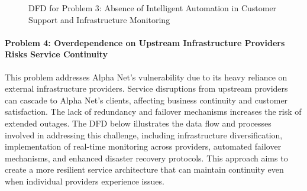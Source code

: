 \begin{figure}[H]
{%
    }
    \caption{DFD for Problem 3: Absence of Intelligent Automation in Customer Support and Infrastructure Monitoring}
    \label{fig:problem3_dfd}
\end{figure}

\clearpage

\paragraph{Problem 4: Overdependence on Upstream Infrastructure Providers Risks Service Continuity}
This problem addresses Alpha Net's vulnerability due to its heavy reliance on external infrastructure providers. Service disruptions from upstream providers can cascade to Alpha Net's clients, affecting business continuity and customer satisfaction. The lack of redundancy and failover mechanisms increases the risk of extended outages. The DFD below illustrates the data flow and processes involved in addressing this challenge, including infrastructure diversification, implementation of real-time monitoring across providers, automated failover mechanisms, and enhanced disaster recovery protocols. This approach aims to create a more resilient service architecture that can maintain continuity even when individual providers experience issues.
